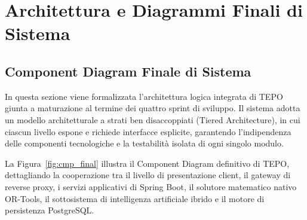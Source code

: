 \section{Architettura e Diagrammi Finali di Sistema}
\label{sec:architettura_diagrammi_finali}

\subsection{Component Diagram Finale di Sistema}
In questa sezione viene formalizzata l'architettura logica integrata di TEPO giunta a maturazione al termine dei quattro sprint di sviluppo. Il sistema adotta un modello architetturale a strati ben disaccoppiati (Tiered Architecture), in cui ciascun livello espone e richiede interfacce esplicite, garantendo l'indipendenza delle componenti tecnologiche e la testabilità isolata di ogni singolo modulo.

La Figura~\ref{fig:cmp_final} illustra il Component Diagram definitivo di TEPO, dettagliando la cooperazione tra il livello di presentazione client, il gateway di reverse proxy, i servizi applicativi di Spring Boot, il solutore matematico nativo OR-Tools, il sottosistema di intelligenza artificiale ibrido e il motore di persistenza PostgreSQL.

